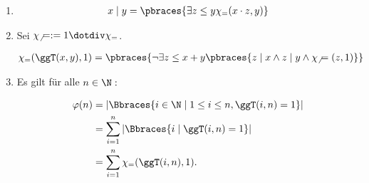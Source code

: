 \begin{solution}

\phantom{}

\begin{enumerate}[label = (\alph*)]

    \item

    \begin{align*}
        x \mid y
        =
        \pbraces
        {
            \exists z \leq y
                \chi_=(x \cdot z, y)
        }
    \end{align*}

    \item Sei $\chi_\neq := 1 \dotdiv \chi_=$.

    \begin{align*}
        \chi_=(\ggT(x, y), 1)
        =
        \pbraces
        {
            \neg
            \exists z \leq x + y
            \pbraces
            {
                z \mid x
                \land
                z \mid y
                \land
                \chi_\neq(z, 1)
            }
        }
    \end{align*}

    \item Es gilt für alle $n \in \N:$

    \begin{align*}
        \varphi(n)
        & =
        |\Bbraces{i \in \N \mid 1 \leq i \leq n, \ggT(i, n) = 1}| \\
        & =
        \sum_{i=1}^n
            |\Bbraces{i \mid \ggT(i, n) = 1}| \\
        & =
        \sum_{i=1}^n
            \chi_=(\ggT(i, n), 1).
    \end{align*}
    
\end{enumerate}

\end{solution}

